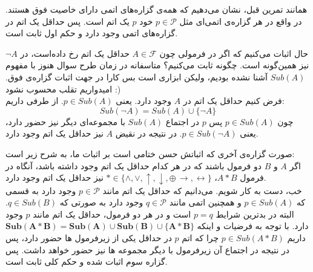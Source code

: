 \documentclass[]{exam}
\begin{document}
همانند تمرین قبل، نشان می‌‌دهیم که همه‌ی گزاره‌های اتمی دارای خاصیت فوق هستند. 
در واقع در هر گزاره‌ی اتمی‌ای مثل 
$p \in \mathscr{P}$
خود
$p$
یک اتم است. پس حداقل یک اتم در گزاره‌های اتمی وجود دارد و حکم اول ثابت است.

حال اثبات می‌کنیم که اگر در فرمولی چون
$A \in \mathscr{F}$
حداقل یک اتم رخ داده‌است، در
$\neg A$
نیز همین‌گونه است.
چگونه ثابت می‌کنیم؟ متاسفانه در زمان طرح سوال هنوز با مفهوم
$Sub(A)$
آشنا نشده بودیم، ولیکن ابزاری است بس کارا در جهت اثبات گزاره‌ی فوق. امیدواریم تقلب محسوب نشود :)
\\
فرض کنیم حداقل یک اتم در 
$A$
وجود دارد. یعنی
$p \in Sub(A)$.
از طرفی داریم:
$$Sub(\neg A) = Sub(A) \cup \{\neg A\}$$
چون 
$p \in Sub(A)$
پس
$p$
در اجتماع 
$Sub(A)$
با مجموعه‌ای دیگر نیز حضور دارد، یعنی 
$p \in Sub(\neg A)$.
در نتیجه در نقیض
$A$
نیز حداقل یک اتم وجود دارد.

صورت گزاره‌ی آخری که اثباتش حسن ختامی است بر اثبات ما، به شرح زیر است:
\\
اگر
$A$
و
$B$
دو فرمول باشند که در هر کدام حداقل یک اتم وجود داشته باشد،
آنگاه در فرمول
$A * B$، 
$* \in \{\land, \lor, \uparrow, \downarrow, \oplus\, \rightarrow, \leftrightarrow \}$
نیز حداقل یک اتم وجود دارد.
\\
خب، دست به کار شویم.
می‌دانیم که حداقل یک اتم مانند
$p \in \mathscr{P}$
وجود دارد به قسمی که 
$p \in Sub(A)$
و همچنین اتمی مانند
$q \in \mathscr{P}$
وجود دارد به صورتی که
$q \in Sub(B)$.
البته در بدترین شرایط
$p = q$
است و در هر دو فرمول، حداقل یک اتم مانند
$p$
وجود دارد.
با توجه به فرضیات و اینکه
$
\mathbf{
Sub(A * B) = Sub(A) \cup Sub(B) \cup \{A * B\}
}
$
داریم
$p \in Sub(A * B)$
چرا که اتم
$p$
در حداقل یکی از زیرفرمول ها حضور دارد،
پس در نتیجه در اجتماع آن زیرفرمول با دیگر مجموعه ها نیز حضور خواهد داشت.
پس گزاره سوم اثبات شده و حکم کلی ثابت است.
\end{document}
